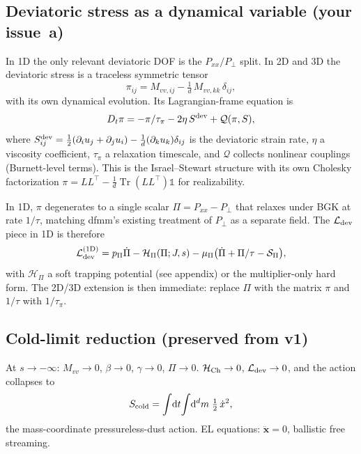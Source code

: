 \documentclass[11pt]{article}
\newcommand{\dd}{\mathrm{d}}
\newcommand{\half}{\tfrac{1}{2}}
\newcommand{\Tr}{\operatorname{Tr}}
\begin{document}
\subsection{Deviatoric stress as a dynamical variable (your issue~a)}
In 1D the only relevant deviatoric DOF is the $P_{xx}/P_\perp$ split. In
2D and 3D the deviatoric stress is a traceless symmetric tensor
\begin{equation}
  \pi_{ij} = M_{vv,ij} - \tfrac{1}{d}\,M_{vv,kk}\,\delta_{ij},
\end{equation}
with its own dynamical evolution. Its Lagrangian-frame equation is
\begin{equation}
  D_t\pi = -\pi/\tau_\pi - 2\eta\,S^{\rm dev} + \mathcal{Q}(\pi, S),
\end{equation}
where $S^{\rm dev}_{ij} = \half(\partial_i u_j + \partial_j u_i) - \frac{1}{d}(\partial_k u_k)\delta_{ij}$ is the deviatoric strain rate, $\eta$ a
viscosity coefficient, $\tau_\pi$ a relaxation timescale, and
$\mathcal{Q}$ collects nonlinear couplings (Burnett-level terms). This
is the Israel--Stewart structure with its own Cholesky factorization
$\pi = LL^\top - \frac{1}{d}\Tr(LL^\top)\mathbb{1}$ for realizability.

In 1D, $\pi$ degenerates to a single scalar $\Pi = P_{xx} - P_\perp$ that
relaxes under BGK at rate $1/\tau$, matching dfmm's existing treatment
of $P_\perp$ as a separate field. The $\mathcal{L}_{\rm dev}$ piece in
1D is therefore
\begin{equation}
  \mathcal{L}_{\rm dev}^{(1\rm D)} = p_\Pi \dot\Pi - \mathcal{H}_\Pi(\Pi; J, s) - \mu_\Pi\bigl(\dot\Pi + \Pi/\tau - \mathcal{S}_\Pi\bigr),
\end{equation}
with $\mathcal{H}_\Pi$ a soft trapping potential (see appendix) or the
multiplier-only hard form. The 2D/3D extension is then immediate: replace
$\Pi$ with the matrix $\pi$ and $1/\tau$ with $1/\tau_\pi$.

\subsection{Cold-limit reduction (preserved from v1)}
At $s\to-\infty$: $M_{vv}\to 0$, $\beta\to 0$, $\gamma\to 0$, $\Pi\to 0$.
$\mathcal{H}_{\rm Ch} \to 0$, $\mathcal{L}_{\rm dev}\to 0$, and the action
collapses to
\begin{equation}
  S_{\rm cold} = \int\!\dd t\!\int\!\dd^d m\;\half\,\dot x^2,
\end{equation}
the mass-coordinate pressureless-dust action. EL equations:
$\ddot{\bm x} = 0$, ballistic free streaming. \checkmark
\end{document}
